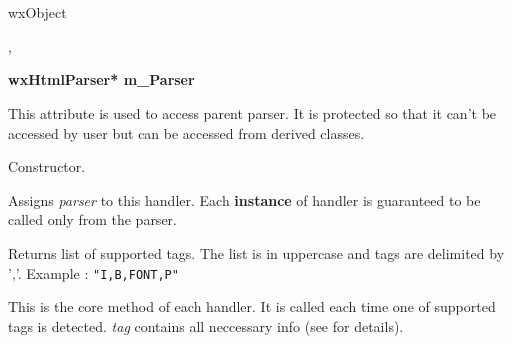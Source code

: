 %
%


\section{}\label{wxhtmltaghandler}


wxObject


,




\label{wxhtmltaghandlermparser}

{\bf wxHtmlParser* m\_Parser}

This attribute is used to access parent parser. It is protected so that
it can't be accessed by user but can be accessed from derived classes.

\label{wxhtmltaghandlerwxhtmltaghandler}


Constructor.

\label{wxhtmltaghandlersetparser}


Assigns {\it parser} to this handler. Each {\bf instance} of handler 
is guaranteed to be called only from the parser.

\label{wxhtmltaghandlergetsupportedtags}


Returns list of supported tags. The list is in uppercase and tags
are delimited by ','. Example : {\tt "I,B,FONT,P" }


\label{wxhtmltaghandlerhandletag}


This is the core method of each handler. It is called each time
one of supported tags is detected. {\it tag} contains all neccessary
info (see  for details).

